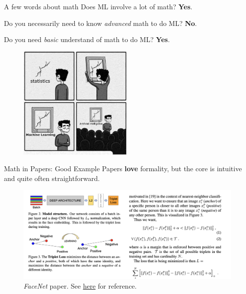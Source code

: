 \documentclass{beamer}
\begin{document}
    \begin{frame}{A few words about math}
        Does ML involve a lot of math? \textbf{Yes}.

        Do you necessarily need to know \textit{advanced} math to do ML? \textbf{No}.

        Do you need \textit{basic} understand of math to do ML? \textbf{Yes}.

        \begin{figure}
        \centering
            \includegraphics[width=0.5\textwidth]{images/presentation/meme.jpg}
        \end{figure}
    \end{frame}
    \begin{frame}{Math in Papers: Good Example}
        Papers \textbf{love} formality, but the core is intuitive and quite often straightforward.

        \begin{figure}
        \centering
            \includegraphics[width=\textwidth]{images/presentation/facenet.png}
            \caption{\textit{FaceNet} paper. See \href{https://arxiv.org/pdf/1503.03832.pdf}{here} for reference.}
        \end{figure}
    \end{frame}
    
\end{document}
